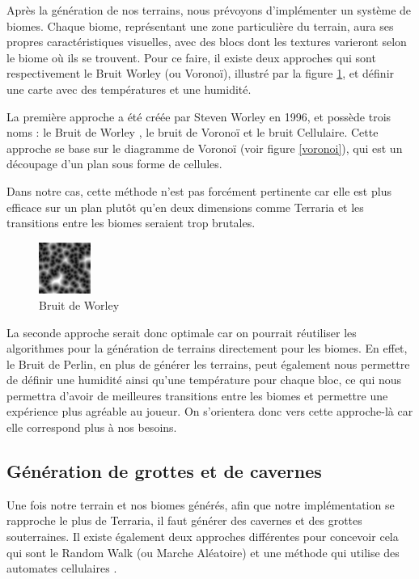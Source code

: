 \documentclass[12pt]{article}
\begin{document}
Après la génération de nos terrains, nous prévoyons d'implémenter un système de biomes. Chaque biome, représentant une zone particulière du terrain, aura ses propres caractéristiques visuelles, avec des blocs dont les textures varieront selon le biome où ils se trouvent. Pour ce faire, il existe deux approches qui sont respectivement le Bruit Worley (ou Voronoï), illustré par la figure \ref{worley}, et définir une carte avec des températures et une humidité.\par
La première approche a été créée par Steven Worley en 1996, et possède trois noms : le Bruit de Worley \cite{worley_noise}, le bruit de Voronoï et le bruit Cellulaire. Cette approche se base sur le diagramme de Voronoï \cite{voronoi_diagram} (voir figure \ref{voronoi}), qui est un découpage d'un plan sous forme de cellules.\par



Dans notre cas, cette méthode n'est pas forcément pertinente car elle est plus efficace sur un plan plutôt qu'en deux dimensions comme Terraria et les transitions entre les biomes seraient trop brutales.\par
\begin{figure}
  \centering
  \includegraphics[width=0.15\textwidth]{assets/Worley.jpg}
  \caption{Bruit de Worley}
  \label{worley}
\end{figure}

La seconde approche serait donc optimale car on pourrait réutiliser les algorithmes pour la génération de terrains directement pour les biomes. En effet, le Bruit de Perlin, en plus de générer les terrains, peut également nous permettre de définir une humidité ainsi qu'une température pour chaque bloc, ce qui nous permettra d'avoir de meilleures transitions entre les biomes et permettre une expérience plus agréable au joueur. On s'orientera donc vers cette approche-là car elle correspond plus à nos besoins.
\par

\vspace{1cm}
\subsection{Génération de grottes et de cavernes}
Une fois notre terrain et nos biomes générés, afin que notre implémentation se rapproche le plus de Terraria, il faut générer des cavernes et des grottes souterraines. Il existe également deux approches différentes pour concevoir cela qui sont le Random Walk \cite{random_walk} (ou Marche Aléatoire) et une méthode qui utilise des automates cellulaires \cite{automate_cellulaire}.\par
\end{document}

